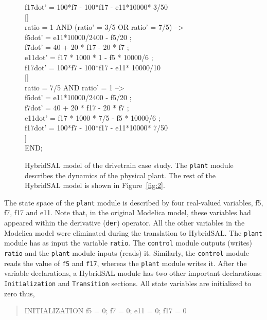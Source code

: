 \documentclass{llncs}
\begin{document}
\begin{figure}[htb!]
\begin{tt}
\begin{tabbing}
  f17dot' = 100*f7 - 100*f17 - e11*10000* 3/50
\\
 \mbox{[]}
\\
ratio = 1 AND (ratio' = 3/5 OR ratio' = 7/5) --> 
\\ \>
  f5dot' = e11*10000/2400 - f5/20 ;
\\ \>
  f7dot' = 40 + 20 * f17 - 20 * f7 ;
\\ \>
  e11dot' = f17 * 1000 * 1 - f5 * 10000/6 ;
\\ \>
  f17dot' = 100*f7 - 100*f17 - e11* 10000/10
\\
 \mbox{[]}
\\
ratio = 7/5 AND ratio' = 1 --> 
\\ \>
  f5dot' = e11*10000/2400 - f5/20 ;
\\ \>
  f7dot' = 40 + 20 * f17 - 20 * f7 ;
\\ \>
  e11dot' = f17 * 1000 * 7/5 - f5 * 10000/6 ;
\\ \>
  f17dot' = 100*f7 - 100*f17 - e11*10000* 7/50
\\
 \mbox{]}
\\
END;
\end{tabbing}
\end{tt}
\caption{HybridSAL model of the drivetrain case study. The {\tt{plant}} module describes the
dynamics of the physical plant. The rest of the HybridSAL model is shown in Figure~\ref{fig:2}.}
\label{fig:1}
\end{figure}

The state space of the {\tt{plant}} module is described by four real-valued variables,
f5, f7, f17 and e11. 
Note that, in the original Modelica model, these variables had appeared within the derivative
({\tt{der}}) operator.
All the other variables in the Modelica model were eliminated during the translation
to HybridSAL.
The {\tt{plant}} module has as input the variable {\tt{ratio}}.
The {\tt{control}} module outputs (writes) {\tt{ratio}} and the {\tt{plant}} module inputs (reads) it.
Similarly,
the {\tt{control}} module reads the value of {\tt{f5}} and {\tt{f17}}, whereas
the {\tt{plant}} module writes it.
After the variable declarations, a HybridSAL module has two other important declarations:
{\tt{Initialization}} and {\tt{Transition}} sections.
All state variables are initialized to zero thus,
\begin{quote}
\begin{tt}
INITIALIZATION f5 = 0; f7 = 0; e11 = 0; f17 = 0
\end{tt}
\end{quote}
\end{document}
